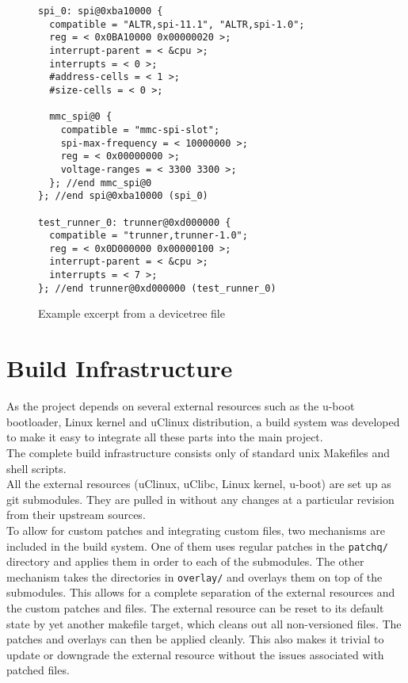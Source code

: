 \begin{figure}[h!]
\lstset{basicstyle=\scriptsize\ttfamily}
\begin{lstlisting}
spi_0: spi@0xba10000 {
  compatible = "ALTR,spi-11.1", "ALTR,spi-1.0";
  reg = < 0x0BA10000 0x00000020 >;
  interrupt-parent = < &cpu >;
  interrupts = < 0 >;
  #address-cells = < 1 >;
  #size-cells = < 0 >;

  mmc_spi@0 {
    compatible = "mmc-spi-slot";
    spi-max-frequency = < 10000000 >;
    reg = < 0x00000000 >;
    voltage-ranges = < 3300 3300 >;
  }; //end mmc_spi@0
}; //end spi@0xba10000 (spi_0)

test_runner_0: trunner@0xd000000 {
  compatible = "trunner,trunner-1.0";
  reg = < 0x0D000000 0x00000100 >;
  interrupt-parent = < &cpu >;
  interrupts = < 7 >;
}; //end trunner@0xd000000 (test_runner_0)
\end{lstlisting}
\caption{Example excerpt from a devicetree file}
\label{listing:dts}
\end{figure}



\newpage
\section{Build Infrastructure}
As the project depends on several external resources such as the u-boot bootloader, Linux kernel
and uClinux distribution, a build system was developed to make it easy to integrate all these
parts into the main project.
\\

The complete build infrastructure consists only of standard unix Makefiles and shell scripts.
\\

All the external resources (uClinux, uClibc, Linux kernel, u-boot) are set up as git submodules.
They are pulled in without any changes at a particular revision from their upstream sources.
\\

To allow for custom patches and integrating custom files, two mechanisms are included in the build
system. One of them uses regular patches in the \texttt{patchq/} directory and applies them in
order to each of the submodules. The other mechanism takes the directories in \texttt{overlay/}
and overlays them on top of the submodules. This allows for a complete separation of the external
resources and the custom patches and files. The external resource can be reset to its default state
by yet another makefile target, which cleans out all non-versioned files. The patches and overlays
can then be applied cleanly. This also makes it trivial to update or downgrade the external
resource without the issues associated with patched files.



